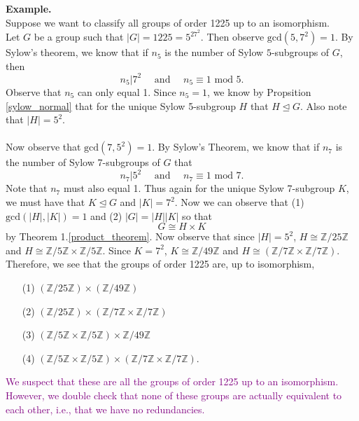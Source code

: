\documentclass[12pt,letterpaper]{algebra_book}
\theoremstyle{definition}
\begin{document}
    \noindent
    \textbf{Example.}
    \\
    \textcolor{NavyBlue}{Suppose we want to classify all groups of order 1225 up to an
    isomorphism.}
    \\
    Let $G$ be a group such that $|G| = 1225 = 5^27^2$. Then observe
    $\mbox{gcd}(5, 7^2) = 1$. By Sylow's theorem, we know that 
    if $n_5$ is the number of Sylow $5$-subgroups of $G$, then 
    \[
        n_5 \big| 7^2 \quad \text{ and }\quad n_5 \equiv 1 \mbox{ mod } 5.
    \]
    Observe that $n_5$ can only equal 1. Since $n_5 = 1$, we know by
    Propsition \ref{sylow_normal} that
    for the unique Sylow 5-subgroup $H$ that $H \unlhd G$. Also note
    that $|H| = 5^2$.
    \\
    \\
    Now observe that $\mbox{gcd}(7, 5^2) = 1$. By Sylow's Theorem, we
    know that if $n_7$ is the number of Sylow 7-subgroups of $G$ that 
    \[
       n_7 \big| 5^2 \quad \text{ and }\quad n_7 \equiv 1 \mbox{ mod } 7.
    \]
    Note that $n_7$ must also equal 1. Thus again for the unique Sylow
    7-subgroup $K$, we must have that $K \unlhd G$ and $|K| = 7^2$. Now we can observe
    that (1) $\mbox{gcd}(|H|, |K|) = 1$ and (2) $|G| = |H||K|$ so that
    \[
        G \cong H \times K     
    \]
    by Theorem 1.\ref{product_theorem}. 
    Now observe that since $|H| = 5^2$, $H \cong
    \mathbb{Z}/25\mathbb{Z}$ and $H \cong \mathbb{Z}/5\mathbb{Z}
    \times \mathbb{Z}/5\mathbb{Z}$. Since $K = 7^2$, $K \cong 
    \mathbb{Z}/49\mathbb{Z}$ and $H \cong (\mathbb{Z}/7\mathbb{Z}
    \times \mathbb{Z}/7\mathbb{Z})$.
    Therefore, we see that the groups of order 1225 are, up to
    isomorphism, 
    \begin{itemize}
        \item[(1)] $(\mathbb{Z}/25\mathbb{Z}) \times (\mathbb{Z}/49\mathbb{Z})$
        \item[(2)] $(\mathbb{Z}/25\mathbb{Z}) \times
        (\mathbb{Z}/7\mathbb{Z} \times \mathbb{Z}/7\mathbb{Z})$
        \item[(3)] $(\mathbb{Z}/5\mathbb{Z} \times \mathbb{Z}/5\mathbb{Z})
        \times \mathbb{Z}/49\mathbb{Z}$
        \item[(4)] $(\mathbb{Z}/5\mathbb{Z} \times \mathbb{Z}/5\mathbb{Z})
        \times (\mathbb{Z}/7\mathbb{Z} \times
        \mathbb{Z}/7\mathbb{Z})$.
    \end{itemize}
    \textcolor{purple}{We suspect that these are all the groups of
    order 1225 up to an isomorphism. However, we double check that
    none of these groups are actually equivalent to each other, i.e.,
    that we have no redundancies.}
\end{document}
